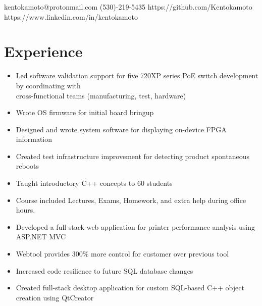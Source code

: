 \documentclass{Custom_CV}
\begin{document}
{kentokamoto@protonmail.com}
{}
{}
{(530)-219-5435}
{https://github.com/Kentokamoto}
{https://www.linkedin.com/in/kentokamoto}

\hfill %
\section{Experience}

\begin{itemize}[noitemsep]
    \item Led software validation support for five 720XP series PoE switch development by coordinating with\\ cross-functional teams (manufacturing, test, hardware)
    \item Wrote OS firmware for initial board bringup
    \item Designed and wrote system software for displaying on-device FPGA information
    \item Created test infrastructure improvement for detecting product spontaneous reboots
\end{itemize}

\begin{itemize}[noitemsep]
    \item Taught introductory C++ concepts to 60 students
    \item Course included Lectures, Exams, Homework, and extra help during office hours.
\end{itemize}
\begin{itemize}[rightmargin=\dimexpr\linewidth-15cm-\leftmargin\relax,noitemsep]
    \item Developed a full-stack web application for printer performance analysis using ASP.NET MVC
    \item Webtool provides 300\% more control for customer over previous tool
    \item Increased code resilience to future SQL database changes
\end{itemize}
\begin{itemize}[rightmargin=\dimexpr\linewidth-15cm-\leftmargin\relax,noitemsep]
\item Created full-stack desktop application for custom SQL-based C++ object creation using QtCreator
\end{itemize}
\end{document}
